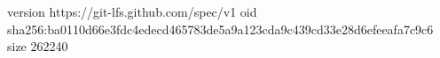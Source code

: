 version https://git-lfs.github.com/spec/v1
oid sha256:ba0110d66e3fdc4edecd465783de5a9a123cda9c439cd33e28d6efeeafa7c9c6
size 262240
